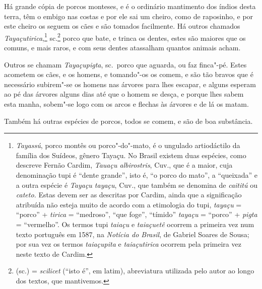 \begin{linenumbers}
 Há grande cópia de porcos monteses, e é o
ordinário mantimento dos índios desta terra, têm o embigo nas costas e
por ele sai um cheiro, como de raposinho, e por este cheiro os seguem
os cães e são tomados facilmente. Há outros chamados
\textit{Tayaçutirica},\footnote{ \textit{Tayassú}, porco
montês ou porco"-do"-mato, é o ungulado artiodáctilo da família dos
Suídeos, gênero Tayaçu. No Brasil existem duas espécies, como descreve
Fernão Cardim, \textit{Tauaçu albirostris}, Cuv., que é a maior, cuja
denominação tupi é ``dente grande'', isto é, ``o porco do mato'', a ``queixada'' 
e a outra espécie é \textit{Tayaçu tayaçu}, Cuv., que também
se denomina de \textit{caititú} ou \textit{cateto.} Estas devem ser as
descritas por Cardim, ainda que a significação atribuída não esteja
muito de acordo com a etimologia do tupi, \textit{tayaçu} = ``porco'' +
\textit{tirica} = ``medroso'', ``que foge'', ``tímido'' \textit{tayaçu} = 
``porco'' + \textit{pigta} = ``vermelho''. Os termos tupi \textit{taiaçu}
e \textit{taiaçuetê} ocorrem a primeira vez num texto português em
1587, na \textit{Notícia do Brasil}, de Gabriel Soares de Sousa; por
sua vez os termos \textit{taiaçupita} e \textit{taiaçutirica} ocorrem
pela primeira vez neste texto de Cardim.} sc.\footnote{ (sc.) = \textit{scilicet} (``isto é'', em latim), abreviatura utilizada pelo autor 
ao longo dos textos, que mantivemos.} porco que bate, e trinca os
dentes, estes são maiores que os comuns, e mais raros, e com seus
dentes atassalham quantos animais acham.

 Outros se chamam \textit{Tayaçupigta}, sc.~porco que aguarda, ou faz
finca"-pé. Estes acometem os cães, e os homens, e tomando"-os os comem, e
são tão bravos que é necessário subirem"-se os homens nas árvores para
lhes escapar, e alguns esperam ao pé das árvores alguns dias até que o
homem se desça, e porque lhes sabem esta manha, sobem"-se logo com os
arcos e flechas às árvores e de lá os matam. 

Também há outras espécies de porcos, todos se comem, e são de boa substância.


\end{linenumbers}
